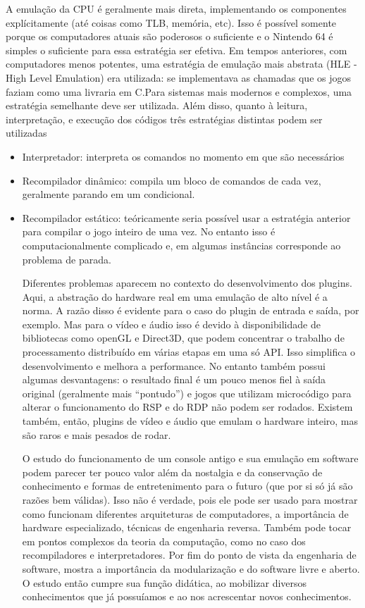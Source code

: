 \documentclass[12pt]{article}
\begin{document}
A emulação da CPU é geralmente mais direta, implementando os componentes explícitamente (até coisas como TLB, memória, etc). Isso é possível somente porque os computadores atuais são poderosos o suficiente e o Nintendo 64 é simples o suficiente para essa estratégia ser efetiva. Em tempos anteriores, com computadores menos potentes, uma estratégia de emulação mais abstrata (HLE - High Level Emulation) era utilizada: se implementava as chamadas que os jogos faziam como uma livraria em C\cite{HLE}.Para sistemas mais modernos e complexos, uma estratégia semelhante deve ser utilizada. Além disso, quanto à leitura, interpretação, e execução dos códigos três estratégias distintas podem ser utilizadas 
\begin{itemize}
\item{Interpretador}: interpreta os comandos no momento em que são necessários
\item{Recompilador dinâmico}: compila um bloco de comandos de cada vez, geralmente parando em um condicional.
\item{Recompilador estático}: teóricamente seria possível usar a estratégia anterior para compilar o jogo inteiro de uma vez. No entanto isso é computacionalmente complicado e, em algumas instâncias corresponde ao problema de parada.

Diferentes problemas aparecem no contexto do desenvolvimento dos plugins. Aqui, a abstração do hardware real em uma emulação de alto nível é a norma. A razão disso é evidente para o caso do plugin de entrada e saída, por exemplo. Mas para o vídeo e áudio isso é devido à disponibilidade de bibliotecas como openGL e Direct3D, que podem concentrar o trabalho de processamento distribuído em várias etapas em uma só API. Isso simplifica o desenvolvimento e melhora a performance. No entanto também possui algumas desvantagens: o resultado final é um pouco menos fiel à saída original (geralmente mais “pontudo”) e jogos que utilizam microcódigo para alterar o funcionamento do RSP e do RDP não podem ser rodados. Existem também, então, plugins de vídeo e áudio que emulam o hardware inteiro, mas são raros e mais pesados de rodar.


O estudo do funcionamento de um console antigo e sua emulação em software podem parecer ter pouco valor além da nostalgia e da conservação de conhecimento e formas de entretenimento para o futuro (que por si só já são razões bem válidas). Isso não é verdade, pois ele pode ser usado para mostrar como funcionam diferentes arquiteturas de computadores, a importância de hardware especializado, técnicas de engenharia reversa. Também pode tocar em pontos complexos da teoria da computação, como no caso dos recompiladores e interpretadores. Por fim do ponto de vista da engenharia de software, mostra a importância da modularização e do software livre e aberto. O estudo então cumpre sua função didática, ao mobilizar diversos conhecimentos que já possuíamos e ao nos acrescentar novos conhecimentos.


\end{itemize}
\end{document}
